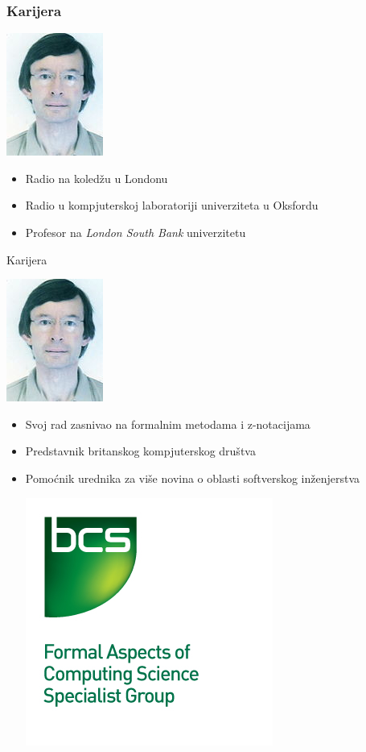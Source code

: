 \documentclass{beamer}
\begin{document}
\begin{frame}
\frametitle{Karijera}
    \begin{center} \includegraphics[scale=3]{Jonathan_Bowen_photograph.jpg} \end{center}
    \begin{itemize}
        \item Radio na koledžu u Londonu
        \item Radio u kompjuterskoj laboratoriji univerziteta u Oksfordu
        \item Profesor na \textit{London South Bank} univerzitetu
    \end{itemize}
\end{frame}

\begin{frame}{Karijera}
    \begin{center} \includegraphics[scale=3]{Jonathan_Bowen_photograph.jpg} \end{center}
    \begin{itemize}
        \item Svoj rad zasnivao na formalnim metodama i z-notacijama
        \item Predstavnik britanskog kompjuterskog društva
        \item Pomoćnik urednika za više novina o oblasti softverskog inženjerstva
	\begin{center} \includegraphics[scale=3]{BCS-FACS_logo.jpg} \end{center}
    \end{itemize}
\end{frame}
\end{document}
